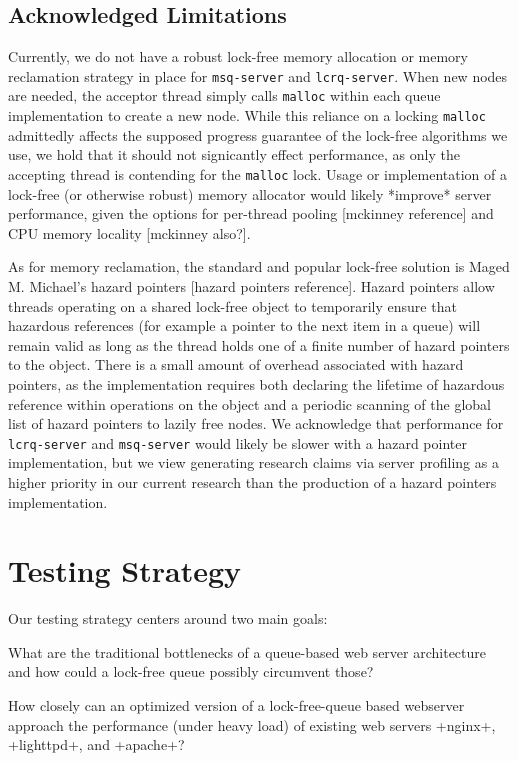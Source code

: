 \documentclass[twoside]{article}
\begin{document}
\begin{multicols}{2}
\subsection{Acknowledged Limitations}

Currently, we do not have a robust lock-free memory allocation or
memory reclamation strategy in place for \verb+msq-server+ and
\verb+lcrq-server+. When new nodes are needed, the acceptor thread simply
calls \verb+malloc+ within each queue implementation to create a new
node. While this reliance on a locking \verb+malloc+ admittedly affects the
supposed progress guarantee of the lock-free algorithms we use, we
hold that it should not signicantly effect performance, as only the
accepting thread is contending for the \verb+malloc+ lock. Usage or
implementation of a lock-free (or otherwise robust) memory allocator
would likely *improve* server performance, given the options for
per-thread pooling [mckinney reference] and CPU memory locality
[mckinney also?].

As for memory reclamation, the standard and popular lock-free solution
is Maged M. Michael's hazard pointers
[hazard pointers reference]. Hazard pointers allow threads operating
on a shared lock-free object to temporarily ensure that hazardous
references (for example a pointer to the next item in a queue) will
remain valid as long as the thread holds one of a finite number of
hazard pointers to the object. There is a small amount of overhead
associated with hazard pointers, as the implementation requires both
declaring the lifetime of hazardous reference within operations on the
object and a periodic scanning of the global list of hazard pointers
to lazily free nodes. We acknowledge that performance for
\verb+lcrq-server+ and \verb+msq-server+ would likely be slower with a hazard
pointer implementation, but we view generating research claims via
server profiling as a higher priority in our current research than the
production of a hazard pointers implementation.

\section{Testing Strategy}

Our testing strategy centers around two main goals:

\begin{compactitem}
\item What are the traditional bottlenecks of a queue-based web server
  architecture and how could a lock-free queue possibly circumvent
  those?
\item How closely can an optimized version of a lock-free-queue based
   webserver approach the performance (under heavy load) of existing
   web servers +nginx+, +lighttpd+, and +apache+?
\end{compactitem}


\end{multicols}
\end{document}
